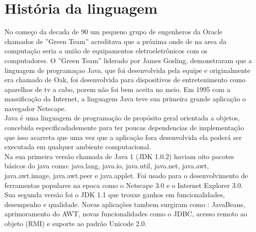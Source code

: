 \section{História da linguagem}

No começo da decada de 90 um pequeno grupo de engenheros da Oracle chamados de ''Green Team'' acreditava que a próxima onde de na area da computação seria a união de equipamentos eletroeletrônicos com os computadores. O ''Green Team'' liderado por James Gosling, demonstraram que a linguagem de programaçao Java, que foi desenvolvida pela equipe e originalmente era chamado de Oak, foi desenvolvida para dispositivos de entretenimento como aparelhos de tv a cabo, porem não foi bem aceita no meio. Em 1995 com a massificação da Internet, a linguagem Java teve sua primeira grande aplicação o navegador Netscape.\\

Java é uma linguagem de programação de propósito geral orientada a objetos, concebida especificadademente para ter poucas dependencias de implementação que isso acarreta que uma vez que a aplicação fora desenvolvida ela poderá ser executada em qualquer ambiente computacional.\\

Na sua primeira versão chamada de Java 1 (JDK 1.0.2) haviam oito pacotes básicos do java como: java.lang, java.io, java.util, java.net, java.awt, java.awt.image, java.awt.peer e java.applet. Foi usado para o desenvolvimento de ferramentas populares na epoca como o Netscape 3.0 e o Internet Explorer 3.0. \\

Sua segunda versão foi o JDK 1.1 \cite{JDK1.1} que trouxe ganhos em funcionalidades, desempenho e qualidade. Novas aplicações tambem surgiram como : JavaBeans, aprimoramento do AWT, novas funcionalidades como o JDBC, acesso remoto ao objeto (RMI) e suporte ao padrão Unicode 2.0.\\

